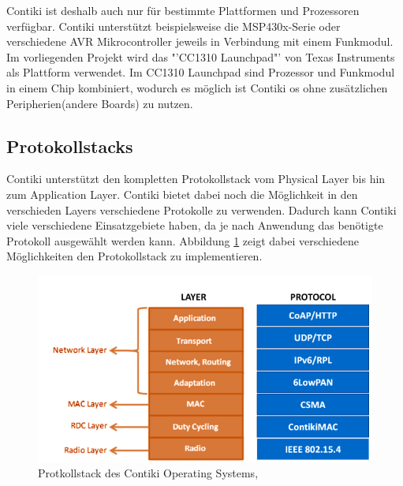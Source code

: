 	Contiki ist deshalb auch nur für bestimmte Plattformen und Prozessoren verfügbar. Contiki unterstützt beispielsweise die MSP430x-Serie oder verschiedene AVR Mikrocontroller jeweils in Verbindung mit einem Funkmodul. Im vorliegenden Projekt wird das "'CC1310 Launchpad"' von Texas Instruments als Plattform verwendet. Im CC1310 Launchpad sind Prozessor und Funkmodul in einem Chip kombiniert, wodurch es möglich ist Contiki \ac{os} ohne zusätzlichen Peripherien(andere Boards) zu nutzen.
	
	\subsection{Protokollstacks}
	Contiki unterstützt den kompletten Protokollstack vom Physical Layer bis hin zum Application Layer. Contiki bietet dabei noch die Möglichkeit in den verschieden Layers verschiedene Protokolle zu verwenden. Dadurch kann Contiki viele verschiedene Einsatzgebiete haben, da je nach Anwendung das benötigte Protokoll ausgewählt werden kann. Abbildung \ref{protokollstack} zeigt dabei verschiedene Möglichkeiten den Protokollstack zu implementieren.\\
	\begin{figure}
		\centering
		\includegraphics[scale=0.5]{Grafiken-Julian/ProtokollStacksContiki.png}
		\caption{Protkollstack des Contiki Operating Systems, \cite{contikiprotokollstack}}
		\label{protokollstack}
	\end{figure}
